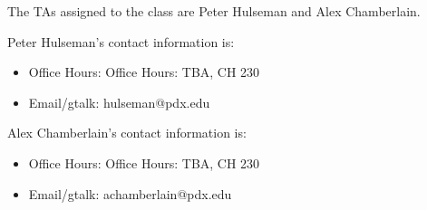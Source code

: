The TAs assigned to the class are Peter Hulseman and Alex Chamberlain. 

Peter Hulseman's contact information is:
\begin{itemize}
\item Office Hours: Office Hours: TBA, CH 230
\item Email/gtalk: hulseman@pdx.edu
\end{itemize}

Alex Chamberlain's contact information is:
\begin{itemize}
\item Office Hours: Office Hours: TBA, CH 230
\item Email/gtalk: achamberlain@pdx.edu
\end{itemize}